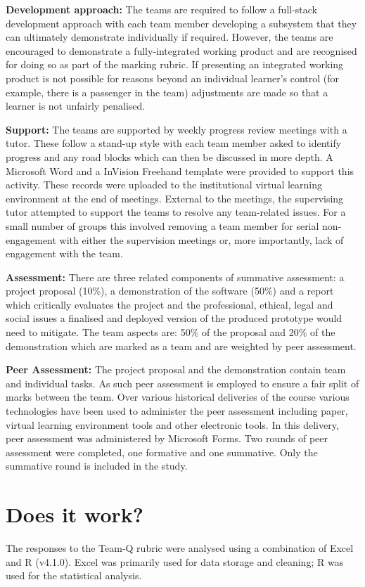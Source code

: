 \documentclass[sigconf, anonymous=true]{acmart}
\begin{document}
\textbf{Development approach:}
The teams are required to follow a full-stack development approach
with each team member developing a subsystem that they can ultimately
demonstrate individually if required. However, the teams are
encouraged to demonstrate a fully-integrated working product and are
recognised for doing so as part of the marking rubric. If presenting
an integrated working product is not possible for reasons beyond an
individual learner's control (for example, there is a passenger in the
team) adjustments are made so that a learner is not unfairly
penalised.

\textbf{Support:}
The teams are supported by weekly progress review meetings with a
tutor. These follow a stand-up style with each team member asked to
identify progress and any road blocks which can then be discussed in
more depth. A Microsoft Word and a InVision Freehand
template were provided to support this activity. These records were
uploaded to the institutional virtual learning environment at the end of
meetings. External to the meetings, the supervising tutor attempted to
support the teams to resolve any team-related issues. For a small
number of groups this involved removing a team member for serial
non-engagement with either the supervision meetings or, more
importantly, lack of engagement with the team.

\textbf{Assessment:}
There are three related components of summative assessment: a project
proposal (10\%), a demonstration of the software (50\%) and a report
which critically evaluates the project and the professional, ethical,
legal and social issues a finalised and deployed version of the
produced prototype would need to mitigate. The team aspects are: 50\%
of the proposal and 20\% of the demonstration which are marked as a
team and are weighted by peer assessment.

\textbf{Peer Assessment:}
The project proposal and the demonstration contain team and individual
tasks. As such peer assessment is employed to ensure a fair split of
marks between the team. Over various historical deliveries of the
course various technologies have been used to administer the peer
assessment including paper, virtual learning environment tools and
other electronic tools. In this delivery, peer assessment was
administered by Microsoft Forms. Two rounds of peer assessment were
completed, one formative and one summative. Only the summative round
is included in the study.

\section{Does it work?}	
The responses to the Team-Q rubric were analysed using a combination
of Excel and R (v4.1.0). Excel was primarily used for data storage
and cleaning; R was used for the statistical analysis.
\end{document}
